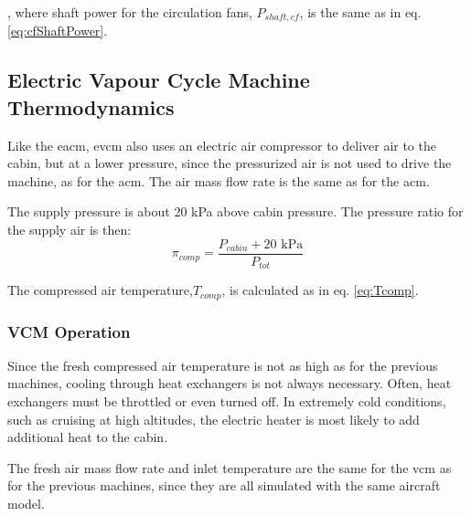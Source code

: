 \documentclass[english]{kththesis}
\begin{document}
, where shaft power for the circulation fans, $P_{shaft,cf}$, is the same as in eq. \ref{eq:cfShaftPower}.

\subsection{Electric Vapour Cycle Machine Thermodynamics}
\label{subsec:EVCMThermodynamics}

Like the \acrshort{eacm}, \acrshort{evcm} also uses an electric air compressor to deliver air to the cabin, but at a lower pressure, since the pressurized air is not used to drive the machine, as for the \acrshort{acm}. The air mass flow rate is the same as for the \acrshort{acm}.

The supply pressure is about 20 kPa above cabin pressure. The pressure ratio for the supply air is then:
\begin{equation}
\pi_{comp} = \frac{P_{cabin}+20 \text{ kPa}}{P_{tot}}
\end{equation}

The compressed air temperature,$T_{comp}$, is calculated as in eq. \ref{eq:Tcomp}.



\subsubsection{VCM Operation}
\label{subsubsec:EVCMOperation}
Since the fresh compressed air temperature is not as high as for the previous machines, cooling through heat exchangers is not always necessary. Often, heat exchangers must be throttled or even turned off. In extremely cold conditions, such as cruising at high altitudes, the electric heater is most likely to add additional heat to the cabin.

The fresh air mass flow rate and inlet temperature are the same for the \acrshort{vcm} as for the previous machines, since they are all simulated with the same aircraft model.
\end{document}
